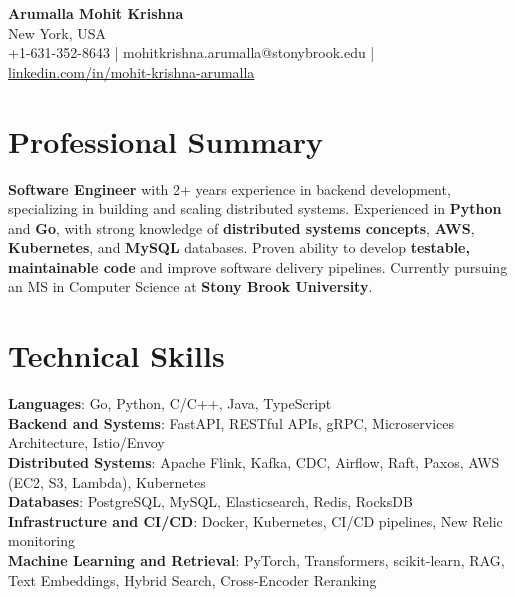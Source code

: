 \documentclass[letterpaper,11pt]{article}
\begin{document}
\begin{center}
  {\Large \textbf{Arumalla Mohit Krishna}} \\
  New York, USA \\
  +1-631-352-8643 \enspace | \enspace mohitkrishna.arumalla@stonybrook.edu \enspace | \enspace \href{https://www.linkedin.com/in/mohit-krishna-arumalla}{linkedin.com/in/mohit-krishna-arumalla}
\end{center}

\section{Professional Summary}
  \begin{itemize}[leftmargin=0.15in, label={}]
    \small{\item{
     \textbf{Software Engineer} with 2+ years experience in backend development, specializing in building and scaling distributed systems. Experienced in \textbf{Python} and \textbf{Go}, with strong knowledge of \textbf{distributed systems concepts}, \textbf{AWS}, \textbf{Kubernetes}, and \textbf{MySQL} databases. Proven ability to develop \textbf{testable, maintainable code} and improve software delivery pipelines. Currently pursuing an MS in Computer Science at \textbf{Stony Brook University}.
    }}
  \end{itemize}
\vspace{-16pt}

\section{Technical Skills}
 \begin{itemize}[leftmargin=0.15in, label={}]
    \small{\item{
     \textbf{Languages}: Go, Python, C/C++, Java, TypeScript \\
     \textbf{Backend and Systems}: FastAPI, RESTful APIs, gRPC, Microservices Architecture, Istio/Envoy \\
     \textbf{Distributed Systems}: Apache Flink, Kafka, CDC, Airflow, Raft, Paxos, AWS (EC2, S3, Lambda), Kubernetes \\
     \textbf{Databases}: PostgreSQL, MySQL, Elasticsearch, Redis, RocksDB \\
     \textbf{Infrastructure and CI/CD}: Docker, Kubernetes, CI/CD pipelines, New Relic monitoring \\
     \textbf{Machine Learning and Retrieval}: PyTorch, Transformers, scikit-learn, RAG, Text Embeddings, Hybrid Search, Cross-Encoder Reranking
    }}
 \end{itemize}
\vspace{-16pt}
\end{document}
